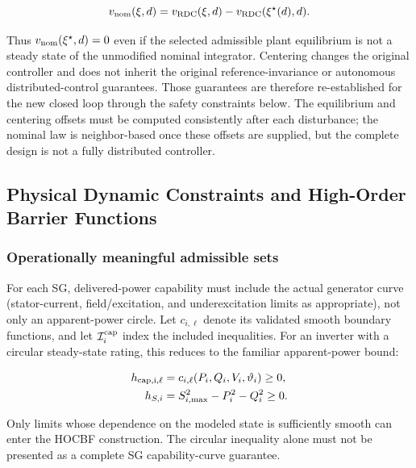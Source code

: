 \documentclass[11pt,twocolumn]{article}
\begin{document}
\begin{equation}\label{eq:centered}
v_{\rm nom}(\xi,d)=v_{\rm RDC}(\xi,d)-v_{\rm RDC}(\xi^\star(d),d).
\end{equation}

Thus $v_{\rm nom}(\xi^\star,d)=0$ even if the selected admissible plant equilibrium is not a steady state of the unmodified nominal integrator. Centering changes the original controller and does not inherit the original reference-invariance or autonomous distributed-control guarantees. Those guarantees are therefore re-established for the new closed loop through the safety constraints below. The equilibrium and centering offsets must be computed consistently after each disturbance; the nominal law is neighbor-based once these offsets are supplied, but the complete design is not a fully distributed controller.

\subsection{Physical Dynamic Constraints and High-Order Barrier Functions}

\label{subsec:safety}

\subsubsection{Operationally meaningful admissible sets}

For each SG, delivered-power capability must include the actual generator curve (stator-current, field/excitation, and underexcitation limits as appropriate), not only an apparent-power circle. Let $c_{i,\ell}$ denote its validated smooth boundary functions, and let $\mathcal I_i^{\rm cap}$ index the included inequalities. For an inverter with a circular steady-state rating, this reduces to the familiar apparent-power bound:

\begin{equation}\label{eq:hs}
\begin{aligned}
h_{\rm cap,i,\ell}&=c_{i,\ell}(P_i,Q_i,V_i,\vartheta_i)\geq0,\\
h_{S,i}&=S_{i,\max}^2-P_i^2-Q_i^2\geq0.
\end{aligned}
\end{equation}

Only limits whose dependence on the modeled state is sufficiently smooth can enter the HOCBF construction. The circular inequality alone must not be presented as a complete SG capability-curve guarantee.
\end{document}
